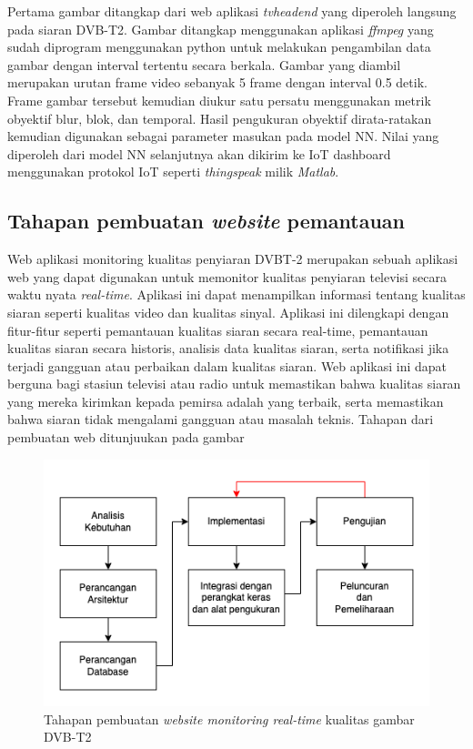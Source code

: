 Pertama gambar ditangkap dari  web aplikasi \textit{tvheadend} yang diperoleh langsung pada siaran DVB-T2. Gambar ditangkap menggunakan aplikasi \textit{ffmpeg} yang sudah diprogram menggunakan python untuk melakukan pengambilan data gambar dengan interval tertentu secara berkala. Gambar yang diambil merupakan urutan frame video sebanyak 5 frame dengan interval 0.5 detik. Frame gambar tersebut kemudian diukur satu persatu menggunakan metrik obyektif blur, blok, dan temporal. Hasil pengukuran obyektif  dirata-ratakan kemudian digunakan sebagai parameter masukan pada model NN. Nilai yang diperoleh dari model NN selanjutnya akan dikirim ke IoT dashboard menggunakan protokol IoT seperti \textit{thingspeak} milik \textit{Matlab}. 


\subsection{Tahapan pembuatan \textit{website} pemantauan}
\hspace{1,2cm}
Web aplikasi monitoring kualitas penyiaran DVBT-2 merupakan sebuah aplikasi web yang dapat digunakan untuk memonitor kualitas penyiaran televisi secara waktu nyata \textit{real-time}. Aplikasi ini dapat menampilkan informasi tentang kualitas siaran seperti kualitas video dan kualitas sinyal. Aplikasi ini dilengkapi dengan fitur-fitur seperti pemantauan kualitas siaran secara real-time, pemantauan kualitas siaran secara historis, analisis data kualitas siaran, serta notifikasi jika terjadi gangguan atau perbaikan dalam kualitas siaran. Web aplikasi ini dapat berguna bagi stasiun televisi atau radio untuk memastikan bahwa kualitas siaran yang mereka kirimkan kepada pemirsa adalah yang terbaik, serta memastikan bahwa siaran tidak mengalami gangguan atau masalah teknis. Tahapan dari pembuatan web ditunjuukan pada gambar 

\begin{figure}[H]
	\vspace{-0.1cm}
	\begin{center}
		\includegraphics[width=0.8\columnwidth]{bab3/Gambar/pembuatan-web.png}
	\end{center}
	\vspace{-0.2cm}
	\caption{Tahapan pembuatan \textit{website monitoring real-time} kualitas gambar DVB-T2}
	\label{pembuatan-web}
\end{figure}

